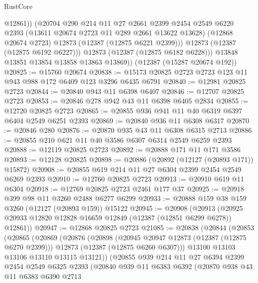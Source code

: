 \begin{lexlean}{RustCore}
\begin{coremodule}
                @12861))
            (@20704
              @290
              @214
              @11
              @27
              @2661
              @2399
              @2454
              @2549
              @6220
              @2393
              (@13611 @20674 @2723 @11 @289 @2661 @13622 @13628)
              (@12868 @20674 @2723)
              @12873
              (@12387 (@12875 @6221 @2399)))
            @12873
            (@12387 (@12875 @6192 @6227)))
          @12873
          (@12387 (@12875 @6182 @6228)))
        @13848
        @13851
        @13854
        @13858
        @13863
        @13869))
    (@12387 (@15287 @20674 @192))
@20825 := @15760 @20674
@20838 := @15173 @20825 @2723 @2723 @123 @11 @943 @988 @172 @6409 @123 @3296 @6435 @6791
@20840 := @12981 @20825 @2723
@20844 := @20840 @943 @11 @6398 @6407
@20846 := @12707 @20825 @2723
@20853 := @20846 @278 @942 @43 @11 @6398 @6405 @2834
@20855 := @12720 @20825 @2723
@20865 := @20855 @936 @941 @11 @40 @6319 @6397 @6404 @2549 @6251 @2393
@20869 := @20840 @936 @11 @6308 @6317
@20870 := @20846 @280
@20876 := @20870 @935 @43 @11 @6308 @6315 @2713
@20886 := @20855 @210 @621 @11 @40 @3586 @6307 @6314 @2549 @6259 @2393
@20888 := @12119 @20825 @2723
@20892 := @20888 @171 @11 @171 @3586
@20893 := @12128 @20825
@20898 := @20886 (@20892 (@12127 (@20893 @171)) @15872)
@20908 := @20855 @619 @214 @11 @27 @6304 @2399 @2454 @2549 @6269 @2393
@20910 := @12760 @20825 @2723
@20913 := @20910 @619 @11 @6304
@20918 := @12769 @20825 @2723 @2461 @177 @37
@20925 := @20918 @399 @98 @11 @3260 @2488 @6277 @6299
@20933 := @20888 @159 @38 @159 @3260 (@12127 (@20893 @159)) @15122
@20945 := @20908
    (@20913 (@20925 @20933 @12820 @12828 @16659 @12849 (@12387 (@12851 @6299 @6278)) @12861))
@20947 := @12868 @20825 @2723
@21085 := @20838
    (@20844
      (@20853
        (@20865
          (@20869
            (@20876
              (@20898
                (@20945 @20947 @12873 (@12387 (@12875 @6270 @2399)))
                @12873
                (@12387 (@12875 @6260 @6307)))
              @13100
              @13103
              @13106
              @13110
              @13115
              @13121))
          (@20855
            @939
            @214
            @11
            @27
            @6394
            @2399
            @2454
            @2549
            @6325
            @2393
            (@20840
              @939
              @11
              @6383
              @6392
              (@20870
                @938
                @43
                @11
                @6383
                @6390
                @2713

\end{coremodule}
\end{lexlean}
